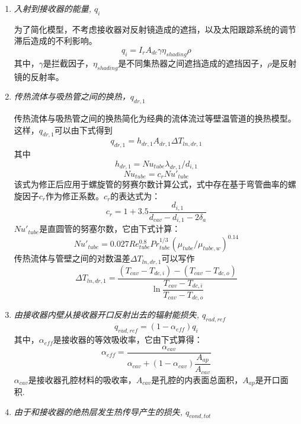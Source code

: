 \begin{enumerate}[label=(\arabic*)]
  \item \emph{入射到接收器的能量, $q_i$}
  
\setlength\parindent{2em}
为了简化模型，不考虑接收器对反射镜造成的遮挡，以及太阳跟踪系统的调节滞后造成的不利影响。
  \begin{equation}
      q_i = I_r A_{dc} \gamma \eta_{shading} \rho
      \label{eq:q_i}
  \end{equation}
其中，$\gamma$是拦截因子，$\eta_{shading}$是不同集热器之间遮挡造成的遮挡因子，$\rho$是反射镜的反射率。
  \item \emph{传热流体与吸热管之间的换热，$q_{dr,1}$}
  
  传热流体与吸热管之间的换热简化为经典的流体流过等壁温管道的换热模型。这样，$q_{dr,1}$可以由下式得到
  \begin{equation}
      q_{dr,1} = h_{dr,1}A_{dr,1}\Delta T_{ln,dr,1}
      \label{eq:q_dr_1}
  \end{equation}
  其中  
  \begin{equation}
      h_{dr,1} = Nu_{tube}\lambda_{dr,1} / d_{i,1}
\end{equation}
\begin{equation}
      Nu_{tube} = c_r Nu'_{tube}
\end{equation}
    该式为修正后应用于螺旋管的努赛尔数计算公式，式中存在基于弯管曲率的螺旋因子$c_r$作为修正系数。$c_r$的表达式为\cite{Pablo2008}：
\begin{equation}
	c_{r}=1+3.5\frac{d_{i,1}}{d_{cav}-d_{i,1}-2\delta_{a}}
\end{equation}
$Nu'_{tube}$是直圆管的努塞尔数，它由下式计算\cite{Serth2007}：
\begin{equation}
	Nu'_{tube}= 0.027Re_{tube}^{0.8}Pr_{tube}^{1/3}(\mu_{tube}/\mu_{tube,w})^{0.14}
\end{equation}
传热流体与管壁之间的对数温差$\Delta{}T_{ln,dr,1}$可以写作
\begin{equation}
	\Delta{}T_{ln,dr,1}=\frac{(T_{cav}-T_{dc,i})-(T_{cav}-T_{dc,o})}{\ln\dfrac{T_{cav}-T_{dc,i}}{T_{cav}-T_{dc,o}}}
\end{equation}

  \item \emph{由接收器内壁从接收器开口反射出去的辐射能损失, $q_{rad,ref}$}
  \begin{equation}
    q_{rad,ref}=(1-\alpha_{eff})q_{i}
\end{equation}
    其中，$\alpha_{eff}$是接收器的等效吸收率，它由下式算得：
    \begin{equation}
    \alpha_{eff}=\frac{\alpha_{cav}}{\alpha_{cav}+(1-\alpha_{cav})\dfrac{A_{ap}}{A_{cav}}}
    \end{equation} 
$\alpha_{cav}$是接收器孔腔材料的吸收率，$A_{cav}$是孔腔的内表面总面积，$A_{ap}$是开口面积.
  \item \emph{由于和接收器的绝热层发生热传导产生的损失, $q_{cond,tot}$}
  

\end{enumerate}
